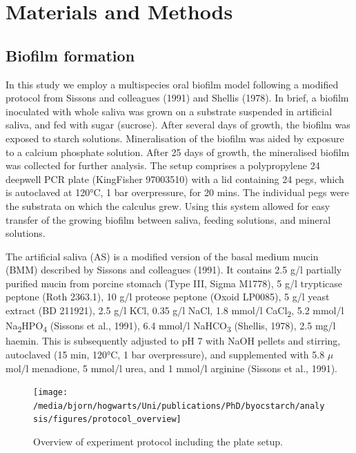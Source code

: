 \documentclass[
]{article}
\begin{document}
\hypertarget{materials-and-methods}{%
\section{Materials and Methods}\label{materials-and-methods}}

\hypertarget{biofilm-formation}{%
\subsection{Biofilm formation}\label{biofilm-formation}}

In this study we employ a multispecies oral biofilm model following a modified
protocol from Sissons and colleagues (1991) and
Shellis (1978). In brief, a biofilm inoculated
with whole saliva was grown on a substrate suspended in artificial saliva, and
fed with sugar (sucrose). After several days of growth, the biofilm was exposed
to starch solutions. Mineralisation of the biofilm was aided by exposure to a
calcium phosphate solution. After 25 days of growth, the mineralised biofilm was
collected for further analysis. The setup comprises a polypropylene
24 deepwell PCR plate (KingFisher 97003510) with a lid containing 24 pegs, which
is autoclaved at 120°C, 1 bar overpressure, for 20 mins. The individual pegs
were the substrata on which the calculus grew. Using this system allowed for easy
transfer of the growing biofilm between saliva, feeding solutions,
and mineral solutions.

The artificial saliva (AS) is a modified version of the basal medium mucin (BMM)
described by Sissons and colleagues (1991).
It contains 2.5 g/l partially purified mucin from porcine stomach (Type III, Sigma M1778),
5 g/l trypticase peptone (Roth 2363.1), 10 g/l proteose peptone (Oxoid LP0085),
5 g/l yeast extract (BD 211921), 2.5 g/l KCl, 0.35 g/l NaCl, 1.8 mmol/l CaCl\textsubscript{2},
5.2 mmol/l Na\textsubscript{2}HPO\textsubscript{4} (Sissons et al., 1991), 6.4 mmol/l NaHCO\textsubscript{3}
(Shellis, 1978), 2.5 mg/l haemin. This is subsequently
adjusted to pH 7 with NaOH pellets and stirring, autoclaved (15 min, 120°C,
1 bar overpressure), and supplemented with 5.8 \(\mu\)mol/l menadione, 5 mmol/l urea,
and 1 mmol/l arginine (Sissons et al., 1991).

\begin{figure}

{\centering \texttt{[image: /media/bjorn/hogwarts/Uni/publications/PhD/byocstarch/analysis/figures/protocol\_overview]} 

}

\caption{Overview of experiment protocol including the plate setup.}\label{fig:protocol-fig}
\end{figure}
\end{document}
